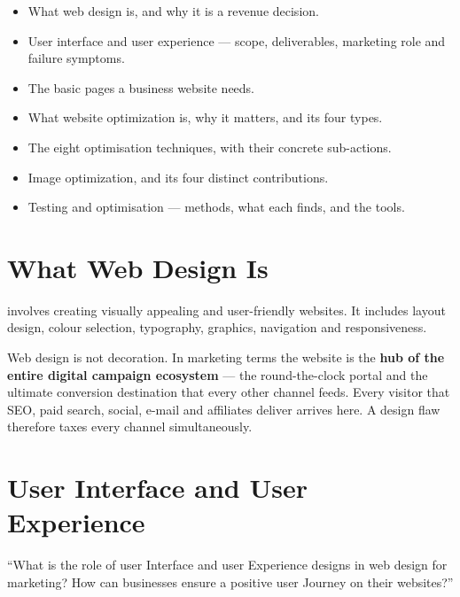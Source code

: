 \documentclass{MMTextbook}
\begin{document}
\begin{learningoutcomes}
\begin{itemize}
\item What web design is, and why it is a revenue decision.
\item User interface and user experience --- scope, deliverables, marketing role
      and failure symptoms.
\item The basic pages a business website needs.
\item What website optimization is, why it matters, and its four types.
\item The eight optimisation techniques, with their concrete sub-actions.
\item Image optimization, and its four distinct contributions.
\item Testing and optimisation --- methods, what each finds, and the tools.
\end{itemize}
\end{learningoutcomes}

\section{What Web Design Is}

\begin{definitionbox}
 involves creating visually appealing and
user-friendly websites. It includes layout design, colour selection, typography,
graphics, navigation and responsiveness.
\end{definitionbox}

\begin{keybox}
Web design is not decoration. In marketing terms the website is the \textbf{hub of
the entire digital campaign ecosystem} --- the round-the-clock portal and the
ultimate conversion destination that every other channel feeds. Every visitor
that SEO, paid search, social, e-mail and affiliates deliver arrives here. A
design flaw therefore taxes every channel simultaneously.
\end{keybox}

\section{User Interface and User Experience}

\begin{keybox}
``What is the role of user Interface and user Experience designs in web design
for marketing? How can businesses ensure a positive user Journey on their
websites?''
\end{keybox}
\end{document}
